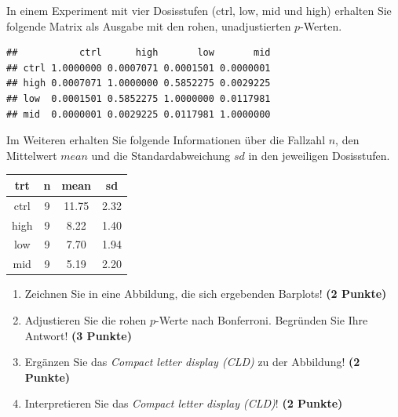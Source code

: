 \documentclass[a4paper, 10pt]{scrartcl}\usepackage[]{graphicx}\usepackage[]{xcolor}
\makeatletter
\newenvironment{kframe}{%
 \def\at@end@of@kframe{}%
 \ifinner\ifhmode%
  \def\at@end@of@kframe{\end{minipage}}%
  \begin{minipage}{\columnwidth}%
 \fi\fi%
 \def\FrameCommand##1{\hskip\@totalleftmargin \hskip-\fboxsep
 \colorbox{shadecolor}{##1}\hskip-\fboxsep
     \hskip-\linewidth \hskip-\@totalleftmargin \hskip\columnwidth}%
 \MakeFramed {\advance\hsize-\width
   \@totalleftmargin\z@ \linewidth\hsize
   \@setminipage}}%
 {\par\unskip\endMakeFramed%
 \at@end@of@kframe}
\newenvironment{knitrout}{}{} %
\makeatother
\begin{document}
In einem Experiment mit vier Dosisstufen (ctrl, low, mid und high) erhalten Sie
folgende Matrix als \Rlogo Ausgabe mit den rohen, unadjustierten $p$-Werten. 



\begin{knitrout}
\color{fgcolor}\begin{kframe}
\begin{verbatim}
##           ctrl      high       low       mid
## ctrl 1.0000000 0.0007071 0.0001501 0.0000001
## high 0.0007071 1.0000000 0.5852275 0.0029225
## low  0.0001501 0.5852275 1.0000000 0.0117981
## mid  0.0000001 0.0029225 0.0117981 1.0000000
\end{verbatim}
\end{kframe}
\end{knitrout}

Im Weiteren erhalten Sie folgende Informationen {\"u}ber die Fallzahl $n$, den
Mittelwert $mean$ und die Standardabweichung $sd$ in den jeweiligen Dosisstufen.

\begin{knitrout}
\color{fgcolor}\begin{table}[!h]
\centering
\begin{tabular}{cccc}
\toprule
trt & n & mean & sd\\
\midrule
ctrl & 9 & 11.75 & 2.32\\
high & 9 & 8.22 & 1.40\\
low & 9 & 7.70 & 1.94\\
mid & 9 & 5.19 & 2.20\\
\bottomrule
\end{tabular}
\end{table}

\end{knitrout}


\begin{enumerate}
\item Zeichnen Sie in eine Abbildung, die sich ergebenden Barplots! \textbf{(2 Punkte)}
\item Adjustieren Sie die rohen $p$-Werte nach Bonferroni. Begr{\"u}nden Sie Ihre Antwort! \textbf{(3 Punkte)}
\item Erg{\"a}nzen Sie das \textit{Compact letter display (CLD)} zu der
  Abbildung! \textbf{(2 Punkte)}
\item Interpretieren Sie das \textit{Compact letter display (CLD)}! \textbf{(2 Punkte)} 
\end{enumerate}
\end{document}
